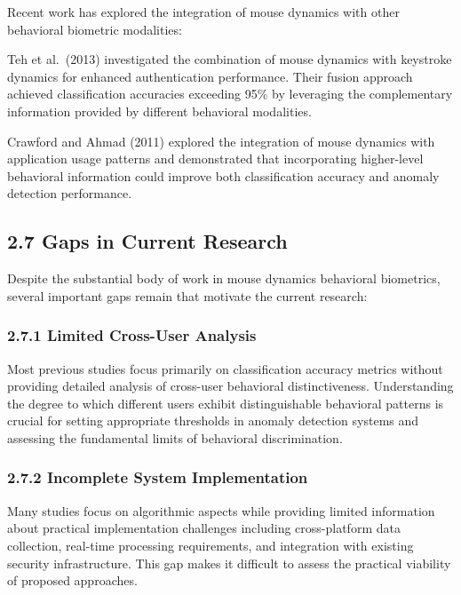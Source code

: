 \documentclass[
  11pt,
  a4paper,
]{article}
\begin{document}
Recent work has explored the integration of mouse dynamics with other
behavioral biometric modalities:

Teh et al.~(2013) investigated the combination of mouse dynamics with
keystroke dynamics for enhanced authentication performance. Their fusion
approach achieved classification accuracies exceeding 95\% by leveraging
the complementary information provided by different behavioral
modalities.

Crawford and Ahmad (2011) explored the integration of mouse dynamics
with application usage patterns and demonstrated that incorporating
higher-level behavioral information could improve both classification
accuracy and anomaly detection performance.

\subsection{2.7 Gaps in Current
Research}\label{gaps-in-current-research}

Despite the substantial body of work in mouse dynamics behavioral
biometrics, several important gaps remain that motivate the current
research:

\subsubsection{2.7.1 Limited Cross-User
Analysis}\label{limited-cross-user-analysis}

Most previous studies focus primarily on classification accuracy metrics
without providing detailed analysis of cross-user behavioral
distinctiveness. Understanding the degree to which different users
exhibit distinguishable behavioral patterns is crucial for setting
appropriate thresholds in anomaly detection systems and assessing the
fundamental limits of behavioral discrimination.

\subsubsection{2.7.2 Incomplete System
Implementation}\label{incomplete-system-implementation}

Many studies focus on algorithmic aspects while providing limited
information about practical implementation challenges including
cross-platform data collection, real-time processing requirements, and
integration with existing security infrastructure. This gap makes it
difficult to assess the practical viability of proposed approaches.
\end{document}
